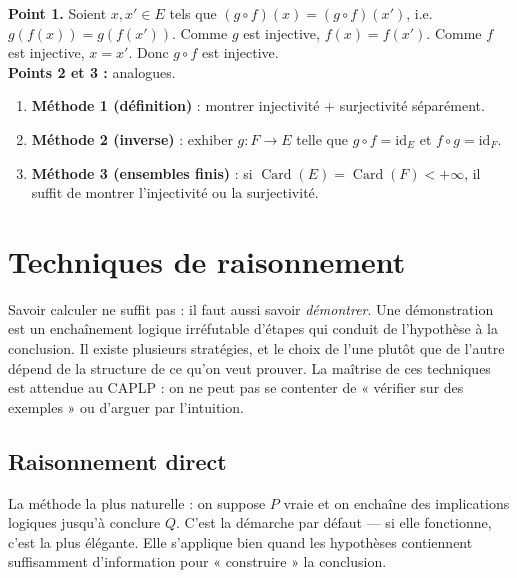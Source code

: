 \documentclass[11pt,a4paper,twoside]{book}
\DeclareMathOperator{\Card}{Card}
\begin{document}
\begin{preuvebox}
\textbf{Point 1.} Soient $x, x' \in E$ tels que $(g \circ f)(x) = (g \circ f)(x')$,
i.e.\ $g(f(x)) = g(f(x'))$. Comme $g$ est injective, $f(x) = f(x')$.
Comme $f$ est injective, $x = x'$. Donc $g \circ f$ est injective.\\
\textbf{Points 2 et 3 :} analogues.
\end{preuvebox}

\begin{methodebox}
\begin{enumerate}
  \item \textbf{Méthode 1 (définition)} : montrer injectivité + surjectivité séparément.
  \item \textbf{Méthode 2 (inverse)} : exhiber $g : F \to E$ telle que $g \circ f = \mathrm{id}_E$
        et $f \circ g = \mathrm{id}_F$.
  \item \textbf{Méthode 3 (ensembles finis)} : si $\Card(E) = \Card(F) < +\infty$, il suffit
        de montrer l'injectivité ou la surjectivité.
\end{enumerate}
\end{methodebox}

\section{Techniques de raisonnement}

Savoir calculer ne suffit pas : il faut aussi savoir \emph{démontrer}. Une démonstration est un enchaînement logique irréfutable d'étapes qui conduit de l'hypothèse à la conclusion. Il existe plusieurs stratégies, et le choix de l'une plutôt que de l'autre dépend de la structure de ce qu'on veut prouver. La maîtrise de ces techniques est attendue au CAPLP : on ne peut pas se contenter de « vérifier sur des exemples » ou d'arguer par l'intuition.

\subsection{Raisonnement direct}

La méthode la plus naturelle : on suppose $P$ vraie et on enchaîne des implications logiques jusqu'à conclure $Q$. C'est la démarche par défaut — si elle fonctionne, c'est la plus élégante. Elle s'applique bien quand les hypothèses contiennent suffisamment d'information pour « construire » la conclusion.
\end{document}
